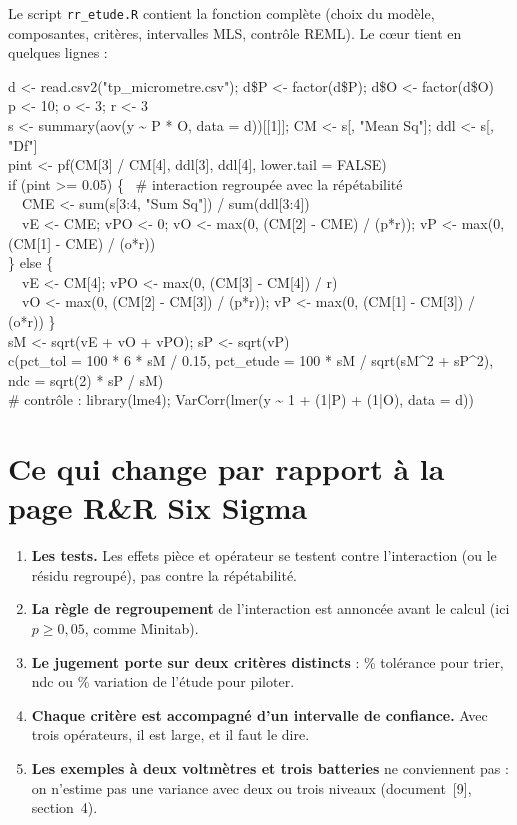 \documentclass[11pt,a4paper]{article}
\theoremstyle{sj}
\theoremstyle{definition}
\theoremstyle{remark}
\begin{document}
Le script \texttt{rr\_etude.R} contient la fonction complète (choix du modèle, composantes, critères, intervalles MLS, contrôle REML). Le cœur tient en quelques lignes :

\begin{code}
d <- read.csv2("tp\_micrometre.csv"); d\$P <- factor(d\$P); d\$O <- factor(d\$O)\\
p <- 10; o <- 3; r <- 3\\
s <- summary(aov(y \textasciitilde{} P * O, data = d))[[1]]; CM <- s[, "Mean Sq"]; ddl <- s[, "Df"]\\
pint <- pf(CM[3] / CM[4], ddl[3], ddl[4], lower.tail = FALSE)\\
if (pint >= 0.05) \{ \ \# interaction regroupée avec la répétabilité\\
\ \ CME <- sum(s[3:4, "Sum Sq"]) / sum(ddl[3:4])\\
\ \ vE <- CME; vPO <- 0; vO <- max(0, (CM[2] - CME) / (p*r)); vP <- max(0, (CM[1] - CME) / (o*r))\\
\} else \{\\
\ \ vE <- CM[4]; vPO <- max(0, (CM[3] - CM[4]) / r)\\
\ \ vO <- max(0, (CM[2] - CM[3]) / (p*r)); vP <- max(0, (CM[1] - CM[3]) / (o*r)) \}\\
sM <- sqrt(vE + vO + vPO); sP <- sqrt(vP)\\
c(pct\_tol = 100 * 6 * sM / 0.15, pct\_etude = 100 * sM / sqrt(sM\textasciicircum2 + sP\textasciicircum2), ndc = sqrt(2) * sP / sM)\\
\# contrôle : library(lme4); VarCorr(lmer(y \textasciitilde{} 1 + (1|P) + (1|O), data = d))
\end{code}

\section{Ce qui change par rapport à la page R\&R Six Sigma}\label{sec:change}

\begin{enumerate}[leftmargin=1.4em]
\item \textbf{Les tests.} Les effets pièce et opérateur se testent contre l'interaction (ou le résidu regroupé), pas contre la répétabilité.
\item \textbf{La règle de regroupement} de l'interaction est annoncée avant le calcul (ici $p\ge0{,}05$, comme Minitab).
\item \textbf{Le jugement porte sur deux critères distincts} : \% tolérance pour trier, ndc ou \% variation de l'étude pour piloter.
\item \textbf{Chaque critère est accompagné d'un intervalle de confiance.} Avec trois opérateurs, il est large, et il faut le dire.
\item \textbf{Les exemples à deux voltmètres et trois batteries} ne conviennent pas : on n'estime pas une variance avec deux ou trois niveaux (document~[9], section~4).
\end{enumerate}
\end{document}

